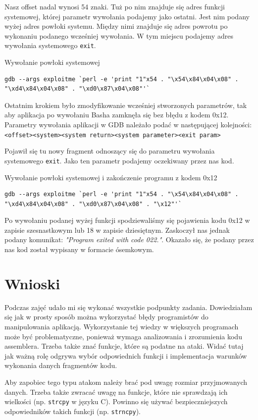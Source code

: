 \documentclass[12pt,a4paper,titlepage]{article}
\begin{document}
Nasz offset nadal wynosi 54 znaki. Tuż po nim znajduje się adres funkcji systemowej, której parametr wywołania podajemy jako ostatni. Jest nim podany wyżej adres powłoki systemu. Między nimi znajduje się adres powrotu po wykonaniu podanego wcześniej wywołania. W tym miejscu podajemy adres wywołania systemowego \texttt{exit}.

\begin{listing}[H]
\caption{Wywołanie powłoki systemowej}
\begin{verbatim}
gdb --args exploitme `perl -e 'print "1"x54 . "\x54\x84\x04\x08" . "\xd4\x84\x04\x08" . "\xd0\x87\x04\x08"'`
\end{verbatim}
\end{listing}

Ostatnim krokiem było zmodyfikowanie wcześniej stworzonych parametrów, tak aby aplikacja po wywołaniu Basha zamknęła się bez błędu z kodem 0x12. Parametry wywołania aplikacji w GDB należało podać w następującej kolejności:
\newline\newline
\texttt{<offset><system><system return><system parameter><exit param>}
\newline

Pojawił się tu nowy fragment odnoszący się do parametru wywołania systemowego \texttt{exit}. Jako ten parametr podajemy oczekiwany przez nas kod.

\begin{listing}[H]
\caption{Wywołanie powłoki systemowej i zakończenie programu z kodem 0x12}
\begin{verbatim}
gdb --args exploitme `perl -e 'print "1"x54 . "\x54\x84\x04\x08" . "\xd4\x84\x04\x08" . "\xd0\x87\x04\x08" . "\x12"'`
\end{verbatim}
\end{listing}

Po wywołaniu podanej wyżej funkcji spodziewaliśmy się pojawienia kodu 0x12 w zapisie szesnastkowym lub 18 w zapisie dziesiętnym. Zaskoczył nas jednak podany komunikat: \textit{"Program exited with code 022."}. Okazało się, że podany przez nas kod został wypisany w formacie ósemkowym.

\section{Wnioski}
Podczas zajęć udało mi się wykonać wszystkie podpunkty zadania. Dowiedziałam się jak w prosty sposób można wykorzystać błędy programistów do manipulowania aplikacją. Wykorzystanie tej wiedzy w większych programach może być problematyczne, ponieważ wymaga analizowania i zrozumienia kodu assemblera. Trzeba także znać funkcje, które są podatne na ataki. Widać tutaj jak ważną rolę odgrywa wybór odpowiednich funkcji i implementacja warunków wykonania danych fragmentów kodu.

Aby zapobiec tego typu atakom należy brać pod uwagę rozmiar przyjmowanych danych. Trzeba także zwracać uwagę na funkcje, które nie sprawdzają ich wielkości (np. \texttt{strcpy} w języku C). Powinno się używać bezpieczniejszych odpowiedników takich funkcji (np. \texttt{strncpy}). 

\newpage


\end{document}
